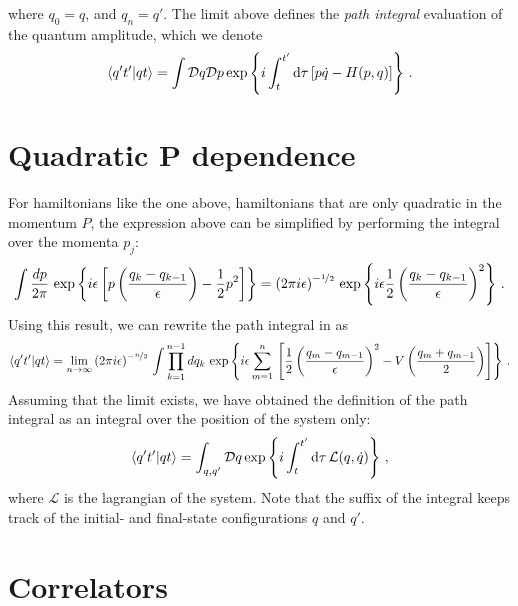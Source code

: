 \documentclass[notes]{subfiles}
\begin{document}
where $q_0 = q$, and $q_n = q'$. The limit above defines the {\em
  path integral} evaluation of the quantum amplitude, which we denote 
\begin{align}
  \label{eq:PathIntDefZero}
  \braket{q't'}{qt} = 
  \int \mathcal{D}q \mathcal{D}p \exp \left\{
  i \int_t^{t'} \dd{\tau} \left[
  p \dot{q} - H(p,q)
  \right]
  \right\}\, .
\end{align}

\section{Quadratic P dependence}
\label{sec:quadr-kinet-term}

For hamiltonians like the one above, \ie hamiltonians that are only
quadratic in the momentum $\hat{P}$, the expression above can be
simplified by performing the integral over the momenta $p_j$:
\begin{align}
  \int \frac{dp}{2\pi}\, \exp\left\{
  i\epsilon\left[
  p \left(\frac{q_k-q_{k-1}}{\epsilon}\right) - \frac12 p^2
  \right]
  \right\} = \left(2\pi i \epsilon\right)^{-\nicefrac{1}{2}}\,
  \exp\left\{i\epsilon
  \frac12\left(\frac{q_k-q_{k-1}}{\epsilon}\right)^2\right\}\, .
\end{align}
Using this result, we can rewrite the path integral in
 as
\begin{align}
  \label{eq:PathIntDefOne}
  \braket{q't'}{qt} = \lim_{n\to\infty}
  \left(2\pi i \epsilon\right)^{-\nicefrac{n}{2}}\,
  \int \prod_{k=1}^{n-1}dq_k\, 
  \exp \left\{
  i \epsilon \sum_{m=1}^{n}
  \, \left[
  \frac12 \left(\frac{q_m-q_{m-1}}{\epsilon}\right)^2
  -V\left(\frac{q_m+q_{m-1}}{2}\right)
  \right]
  \right\}\, .
\end{align}
Assuming that the limit exists, we have obtained the definition of the
path integral as an integral over the position of the system only: 
\begin{align}
  \label{eq:PathIntDef}
  \braket{q't'}{qt} = 
  \int_{q,q'} \mathcal{D}q \exp \left\{
  i \int_t^{t'} \dd{\tau}  \mathcal{L}(q,\dot{q})
  \right\}\, ,
\end{align}
where $\mathcal{L}$ is the lagrangian of the system. Note that the
suffix of the integral keeps track of the initial- and final-state
configurations $q$ and $q'$. 

\section{Correlators}
\label{sec:correlators}
\end{document}
